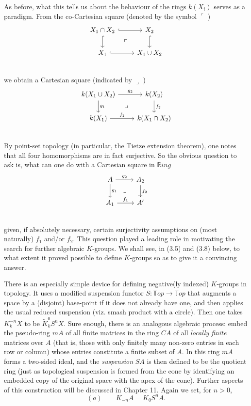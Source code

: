 As before, what this tells us about the behaviour of the rings $k(X_i)$ serves as a paradigm. From the co-Cartesian square (denoted by the symbol $\ulcorner$ )
 \[
 \begin{tikzcd}
 X_1\cap X_2 \arrow[hook]{r} \arrow[hook]{d} \arrow[dr, phantom, "\ulcorner"] &
  X_2 \arrow[hook]{d}\\
 X_1 \arrow[hook]{r} & X_1\cup X_2\\
 \end{tikzcd}
 \]
we obtain a Cartesian square (indicated by $\lrcorner$ )
\[
\begin{tikzcd}
k(X_1\cup X_2) \arrow{r}{g_2} \arrow{d}{g_1} \arrow[dr, phantom, "\lrcorner"] & k(X_2) \arrow{d}{f_2}\\
k(X_1) \arrow{r}{f_1} & k(X_1\cap X_2) \\
\end{tikzcd}
\]
By point-set topology (in particular, the Tietze extension theorem), one notes that all four homomorphisms are in fact surjective. So the obvious question to ask is, what can one do with a Cartesian square in $\mathbb{R}ing$
\begin{equation}
  \begin{tikzcd}
A \arrow{r}{g_2} \arrow{d}{g_1} \arrow[dr, phantom, "\lrcorner"]& A_2 \arrow{d}{f_2}\\
A_1 \arrow{r}{f_1} & A' \\
\end{tikzcd}
\end{equation}
given, if absolutely necessary, certain surjectivity assumptions on (most naturally) $f_1$ and/or $f_2$. This question played a leading role in motivating the search for further algebraic $K$-groups. We shall see, in (3.5) and (3.8) below, to what extent it proved possible to define $K$-groups so as to give it a convincing answer.

There is an especially simple device for defining negative(ly indexed) $K$-groups in topology. It uses a modified suspension functor $S \colon   \mathbb{T}op \longrightarrow \mathbb{T}op$ that augments a space by a (disjoint) base-point if it does not already have one, and then applies the usual reduced suspension (viz. smash product with a circle). Then one takes $K^{-n}_kX$ to be $\widetilde{K}_k^0S^nX$. Sure enough, there is an analogous algebraic process: embed the pseudo-ring $mA$ of all finite matrices in the ring $CA$ of all {\em locally finite} matrices over $A$ (that is, those with only finitely many non-zero entries in each row or column) whose entries constitute a finite subset of $A$. In this ring $mA$ forms a two-sided ideal, and the {\em suspension} $SA$ is then defined to be the quotient ring (just as topological suspension is formed from the cone by identifying an embedded copy of the original space with the apex of the cone). Further aspects of this construction will be discussed in Chapter 11. Again we set, for $n>0$,
\begin{equation}
 (a)\quad \quad K_{-n}A=K_0S^n A.
\end{equation}


